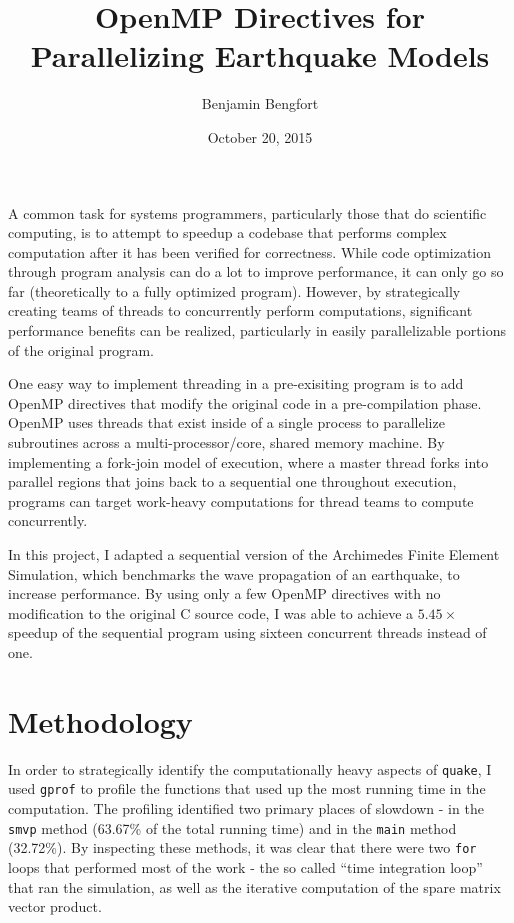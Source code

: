 \documentclass[11pt,letterpaper]{article}
\begin{document}
\title{OpenMP Directives for Parallelizing Earthquake Models}
\author[ ]{Benjamin Bengfort}

\date{October 20, 2015}

\maketitle

A common task for systems programmers, particularly those that do scientific computing, is to attempt to speedup a codebase that performs complex computation after it has been verified for correctness. While code optimization through program analysis can do a lot to improve performance, it can only go so far (theoretically to a fully optimized program). However, by strategically creating teams of threads to concurrently perform computations, significant performance benefits can be realized, particularly in easily parallelizable portions of the original program.

One easy way to implement threading in a pre-exisiting program is to add OpenMP directives that modify the original code in a pre-compilation phase. OpenMP uses threads that exist inside of a single process to parallelize subroutines across a multi-processor/core, shared memory machine. By implementing a fork-join model of execution, where a master thread forks into parallel regions that joins back to a sequential one throughout execution, programs can target work-heavy computations for thread teams to compute concurrently.

In this project, I adapted a sequential version of the Archimedes Finite Element Simulation, which benchmarks the wave propagation of an earthquake, to increase performance. By using only a few OpenMP directives with no modification to the original C source code, I was able to achieve a $5.45\times$ speedup of the sequential program using sixteen concurrent threads instead of one.

\section*{Methodology}

In order to strategically identify the computationally heavy aspects of \texttt{quake}, I used \texttt{gprof} to profile the functions that used up the most running time in the computation. The profiling identified two primary places of slowdown - in the \texttt{smvp} method (63.67\% of the total running time) and in the \texttt{main} method (32.72\%). By inspecting these methods, it was clear that there were two \texttt{for} loops that performed most of the work - the so called ``time integration loop'' that ran the simulation, as well as the iterative computation of the spare matrix vector product.
\end{document}
